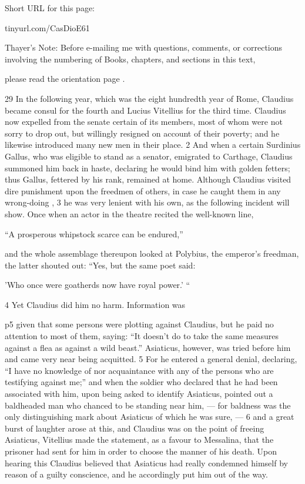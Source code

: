 
Short URL for this page:

tinyurl.com/CasDioE61

Thayer's Note: Before e-mailing me with questions, comments, or corrections involving the numbering of Books, chapters, and sections in this text,

please read the orientation page .


29
In the following year, which was the eight hundredth year of Rome, Claudius became consul for the fourth and Lucius Vitellius for the third time. Claudius now expelled from the senate certain of its members, most of whom were not sorry to drop out, but willingly resigned on account of their poverty; and he likewise introduced many new men in their place. 2 And when a certain Surdinius Gallus, who was eligible to stand as a senator, emigrated to Carthage, Claudius summoned him back in haste, declaring he would bind him with golden fetters; thus Gallus, fettered by his rank, remained at home. Although Claudius visited dire punishment upon the freedmen of others, in case he caught them in any wrong-doing , 3 he was very lenient with his own, as the following incident will show. Once when an actor in the theatre recited the well-known line,

``A prosperous whipstock scarce can be endured,''

and the whole assemblage thereupon looked at Polybius, the emperor's freedman, the latter shouted out: ``Yes, but the same poet said:

'Who once were goatherds now have royal power.' ``

4
Yet Claudius did him no harm. Information was

p5 given that some persons were plotting against Claudius, but he paid no attention to most of them, saying: ``It doesn't do to take the same measures against a flea as against a wild beast.'' Asiaticus, however, was tried before him and came very near being acquitted. 5 For he entered a general denial, declaring, ``I have no knowledge of nor acquaintance with any of the persons who are testifying against me;'' and when the soldier who declared that he had been associated with him, upon being asked to identify Asiaticus, pointed out a baldheaded man who chanced to be standing near him, \texthebrew{—} for baldness was the only distinguishing mark about Asiaticus of which he was sure, \texthebrew{—} 6 and a great burst of laughter arose at this, and Claudius was on the point of freeing Asiaticus, Vitellius made the statement, as a favour to Messalina, that the prisoner had sent for him in order to choose the manner of his death. Upon hearing this Claudius believed that Asiaticus had really condemned himself by reason of a guilty conscience, and he accordingly put him out of the way.

